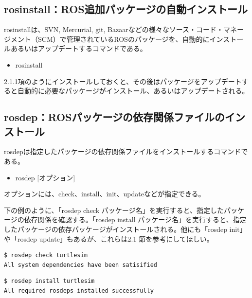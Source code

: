 \subsection{rosinstall：ROS追加パッケージの自動インストール}

rosinstallは、SVN, Mercurial, git, Bazaarなどの様々なソース・コード・マネージメント（SCM）で管理されているROSのパッケージを、自動的にインストールあるいはアップデートするコマンドである。

\begin{itemize}
\item rosinstall
\end{itemize}

2.1.1項のようにインストールしておくと、その後はパッケージをアップデートすると自動的に必要なパッケージがインストール、あるいはアップデートされる。

\subsection{rosdep：ROSパッケージの依存関係ファイルのインストール}

rosdepは指定したパッケージの依存関係ファイルをインストールするコマンドである。

\begin{itemize}
\item  rosdep [オプション]
\end{itemize}

オプションには、check、install、init、updateなどが指定できる。

下の例のように、「rosdep check パッケージ名」を実行すると、指定したパッケージの依存関係を確認する。「rosdep install パッケージ名」を実行すると、指定したパッケージの依存パッケージがインストールされる。他にも「rosdep init」や「rosdep update」もあるが、これらは2.1 節を参考にしてほしい。

\begin{lstlisting}[language=ROS]
$ rosdep check turtlesim
All system dependencies have been satisified
\end{lstlisting}

\begin{lstlisting}[language=ROS]
$ rosdep install turtlesim
All required rosdeps installed successfully
\end{lstlisting}

